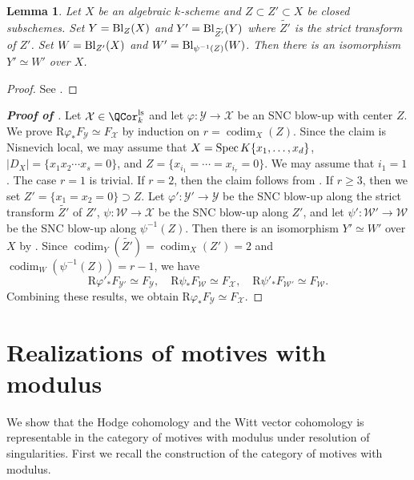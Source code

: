 \documentclass{amsart}
\theoremstyle{plain}
\newtheorem{lemma}[theorem]{Lemma}
\theoremstyle{definition}
\theoremstyle{remark}
\numberwithin{equation}{section}
\DeclareMathOperator{\codim}{codim}
\def\ls{\mathrm{ls}}
\begin{document}
\begin{lemma}\label{blowup_exchange}
	Let $X$ be an algebraic $k$-scheme and $Z\subset Z'\subset X$ be closed subschemes.
	Set $Y=\operatorname{Bl}_Z(X)$ and $Y'=\operatorname{Bl}_{\widetilde{Z'}}(Y)$ where $\widetilde{Z'}$ is the strict transform of $Z'$.
	Set $W=\operatorname{Bl}_{Z'}(X)$ and $W'=\operatorname{Bl}_{\psi^{-1}(Z)}(W)$.
	Then there is an isomorphism $Y'\simeq W'$ over $X$.
\end{lemma}

\begin{proof}
	See \cite[Lemma 2.15]{BRS}.
\end{proof}






\begin{proof}[\bf{Proof of }]
	Let $\mathcal{X}\in \QCor_k^\ls$ and let $\varphi\colon \mathcal{Y}\to \mathcal{X}$ be an SNC blow-up with center $Z$.
	We prove $\mathrm{R}\varphi_*F_\mathcal{Y}\simeq F_\mathcal{X}$ by induction on $r=\codim_X(Z)$.
	Since the claim is Nisnevich local, we may assume that $X=\operatorname{Spec} K\{x_1,\dots,x_d\}$, $|D_X|=\{x_1x_2\cdots x_s=0\}$, and $Z=\{x_{i_1}=\cdots=x_{i_r}=0\}$.
	We may assume that $i_1=1$.
	The case $r=1$ is trivial.
	If $r=2$, then the claim follows from .
	If $r\geq 3$, then we set $Z'=\{x_1=x_2=0\}\supset Z$.
	Let $\varphi'\colon \mathcal{Y}'\to \mathcal{Y}$ be the SNC blow-up along the strict transform $\widetilde{Z'}$ of $Z'$, $\psi\colon \mathcal{W}\to \mathcal{X}$ be the SNC blow-up along $Z'$, and let $\psi'\colon \mathcal{W}'\to \mathcal{W}$ be the SNC blow-up along $\psi^{-1}(Z)$.
	Then there is an isomorphism $Y'\simeq W'$ over $X$ by .
	Since $\codim_Y(\widetilde{Z'})=\codim_X(Z')=2$ and $\codim_W(\psi^{-1}(Z))=r-1$, we have
	$$
		\mathrm{R}\varphi'_*F_\mathcal{Y'}\simeq F_\mathcal{Y},\quad \mathrm{R}\psi_*F_\mathcal{W}\simeq F_\mathcal{X},\quad \mathrm{R}\psi'_*F_{\mathcal{W}'}\simeq F_\mathcal{W}.
	$$
	Combining these results, we obtain $\mathrm{R}\varphi_*F_\mathcal{Y}\simeq F_\mathcal{X}$.
\end{proof}



\section{Realizations of motives with modulus}

We show that the Hodge cohomology and the Witt vector cohomology is representable in the category of motives with modulus under resolution of singularities.
First we recall the construction of the category of motives with modulus.
\end{document}
